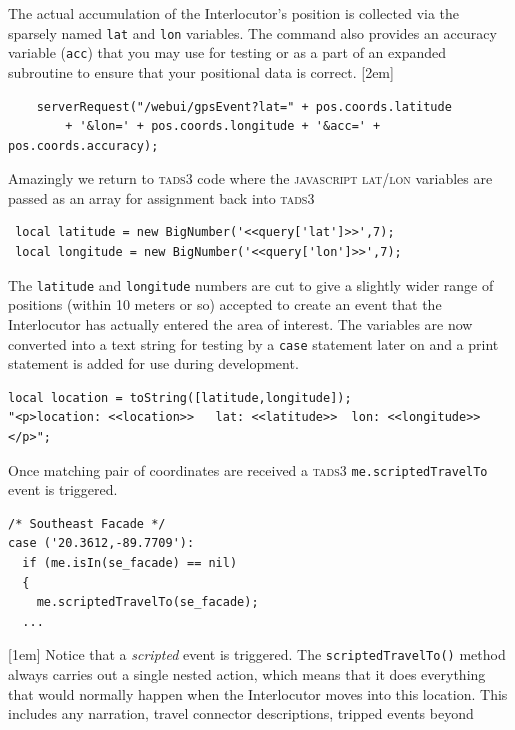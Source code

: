 The actual accumulation of the Interlocutor's position is collected via the
sparsely named \texttt{lat} and \texttt{lon} variables. The command also
provides an accuracy variable (\texttt{acc}) that you may use for testing or as
a part of an expanded subroutine to ensure that your positional data is correct.
[2em]
\begin{lstlisting}
    serverRequest("/webui/gpsEvent?lat=" + pos.coords.latitude
        + '&lon=' + pos.coords.longitude + '&acc=' + pos.coords.accuracy);
\end{lstlisting}
Amazingly we return to \textsc{tads3} code where the \textsc{javascript} \textsc{lat/lon}
variables are passed as an array for assignment back into \textsc{tads3}
\begin{lstlisting}
 local latitude = new BigNumber('<<query['lat']>>',7);
 local longitude = new BigNumber('<<query['lon']>>',7);
\end{lstlisting}
The \texttt{\scriptsize{latitude}} and \texttt{\scriptsize{longitude}} numbers are cut to give a slightly
wider range of positions (within 10 meters or so) accepted to create an event
that the Interlocutor has actually entered the area of interest. The variables
are now converted into a text string for testing by a \texttt{\scriptsize{case}} statement
later on and a print statement is added for use during development.
\begin{lstlisting}
local location = toString([latitude,longitude]);
"<p>location: <<location>>   lat: <<latitude>>  lon: <<longitude>>
</p>";
\end{lstlisting}
Once matching pair of coordinates are received a \textsc{tads3} \texttt{\scriptsize{me.scriptedTravelTo}} event is triggered.
\begin{lstlisting}
/* Southeast Facade */
case ('20.3612,-89.7709'): 
  if (me.isIn(se_facade) == nil)
  {
    me.scriptedTravelTo(se_facade);
  ...
\end{lstlisting}
[1em]
Notice that a \emph{scripted} event is triggered. The \texttt{\scriptsize{scriptedTravelTo()}} method
always carries out a single nested action, which means that it does everything
that would normally happen when the Interlocutor moves into this location. This
includes any narration, travel connector descriptions, tripped events beyond
